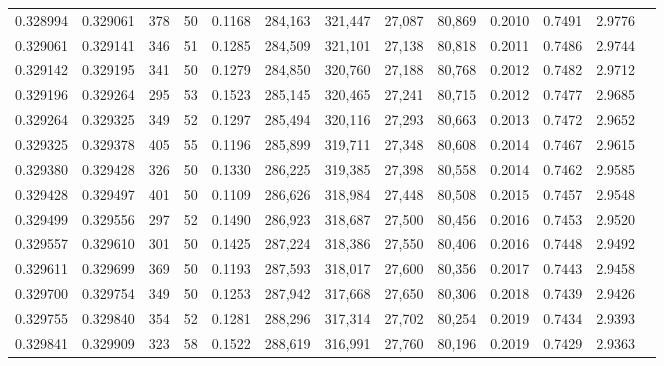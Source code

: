 \begin{tabular}{rrrrrrrrrrrrr}
0.328994 & 0.329061 &   378 &  50 &                                     0.1168 & 284,163 & 321,447 &  27,087 &  80,869 & 0.2010 & 0.7491 & 2.9776 \\
0.329061 & 0.329141 &   346 &  51 &                                     0.1285 & 284,509 & 321,101 &  27,138 &  80,818 & 0.2011 & 0.7486 & 2.9744 \\
0.329142 & 0.329195 &   341 &  50 &                                     0.1279 & 284,850 & 320,760 &  27,188 &  80,768 & 0.2012 & 0.7482 & 2.9712 \\
0.329196 & 0.329264 &   295 &  53 &                                     0.1523 & 285,145 & 320,465 &  27,241 &  80,715 & 0.2012 & 0.7477 & 2.9685 \\
0.329264 & 0.329325 &   349 &  52 &                                     0.1297 & 285,494 & 320,116 &  27,293 &  80,663 & 0.2013 & 0.7472 & 2.9652 \\
0.329325 & 0.329378 &   405 &  55 &                                     0.1196 & 285,899 & 319,711 &  27,348 &  80,608 & 0.2014 & 0.7467 & 2.9615 \\
0.329380 & 0.329428 &   326 &  50 &                                     0.1330 & 286,225 & 319,385 &  27,398 &  80,558 & 0.2014 & 0.7462 & 2.9585 \\
0.329428 & 0.329497 &   401 &  50 &                                     0.1109 & 286,626 & 318,984 &  27,448 &  80,508 & 0.2015 & 0.7457 & 2.9548 \\
0.329499 & 0.329556 &   297 &  52 &                                     0.1490 & 286,923 & 318,687 &  27,500 &  80,456 & 0.2016 & 0.7453 & 2.9520 \\
0.329557 & 0.329610 &   301 &  50 &                                     0.1425 & 287,224 & 318,386 &  27,550 &  80,406 & 0.2016 & 0.7448 & 2.9492 \\
0.329611 & 0.329699 &   369 &  50 &                                     0.1193 & 287,593 & 318,017 &  27,600 &  80,356 & 0.2017 & 0.7443 & 2.9458 \\
0.329700 & 0.329754 &   349 &  50 &                                     0.1253 & 287,942 & 317,668 &  27,650 &  80,306 & 0.2018 & 0.7439 & 2.9426 \\
0.329755 & 0.329840 &   354 &  52 &                                     0.1281 & 288,296 & 317,314 &  27,702 &  80,254 & 0.2019 & 0.7434 & 2.9393 \\
0.329841 & 0.329909 &   323 &  58 &                                     0.1522 & 288,619 & 316,991 &  27,760 &  80,196 & 0.2019 & 0.7429 & 2.9363 \\

\end{tabular}
